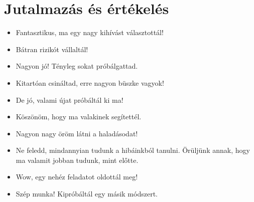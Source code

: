 \section{Jutalmazás és értékelés}
\label{jutalmazas}


\begin{itemize}

      \item
            Fantasztikus, ma egy nagy kihívást választottál!
      \item
            Bátran rizikót vállaltál!
      \item
            Nagyon jó! Tényleg sokat próbálgattad.
      \item
            Kitartóan csináltad, erre nagyon büszke vagyok!
      \item
            De jó, valami újat próbáltál ki ma!
      \item
            Köszönöm, hogy ma valakinek segítettél.
      \item
            Nagyon nagy öröm látni a haladásodat!
      \item
            Ne feledd, mindannyian tudunk a hibáinkból tanulni. Örüljünk annak,
            hogy ma valamit jobban tudunk, mint előtte.
      \item
            Wow, egy nehéz feladatot oldottál meg!
      \item
            Szép munka! Kipróbáltál egy másik módszert.
\end{itemize}